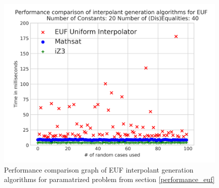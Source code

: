 \begin{figure}
  \centering
  \includegraphics[scale=0.9]{figures/eufi_performance_graph_20_10_3_40_100}
  \caption{Performance comparison graph of EUF interpolant generation
  algorithms for paramatrized problem from section \ref{performance_euf}} 
  \label{performance_graph_euf}
\end{figure}

